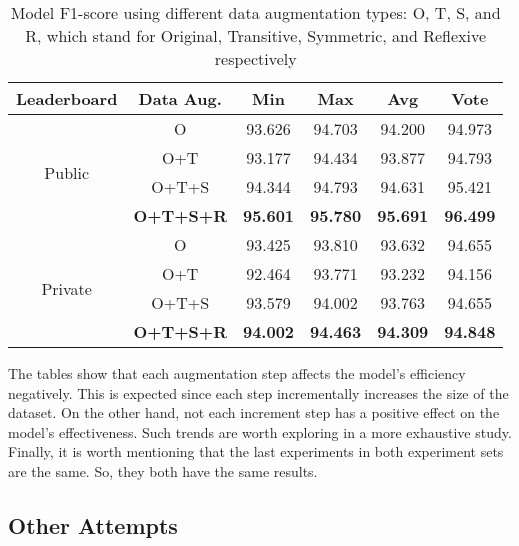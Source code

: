\documentclass[11pt,a4paper]{article}
\begin{document}
\begin{table*}
\centering
\caption{Model F1-score using different data augmentation types: O, T, S, and R, which stand for Original, Transitive, Symmetric, and Reflexive respectively}
\label{tab:p2_2}
\begin{tabular}{|c|c|c|c|c|c|}
\hline
Leaderboard              & Data Aug. & Min             & Max             & Avg             & Vote            \\ \hline
\multirow{4}{*}{Public}  & O                 & 93.626          & 94.703          & 94.200          & 94.973          \\ \cline{2-6} 
                         & O+T               & 93.177          & 94.434          & 93.877          & 94.793          \\ \cline{2-6} 
                         & O+T+S             & 94.344          & 94.793          & 94.631          & 95.421          \\ \cline{2-6} 
                         & \textbf{O+T+S+R}  & \textbf{95.601} & \textbf{95.780} & \textbf{95.691} & \textbf{96.499} \\ \hline
\multirow{4}{*}{Private} & O                 & 93.425          & 93.810          & 93.632          & 94.655          \\ \cline{2-6} 
                         & O+T               & 92.464          & 93.771          & 93.232          & 94.156          \\ \cline{2-6} 
                         & O+T+S             & 93.579          & 94.002          & 93.763          & 94.655          \\ \cline{2-6} 
                         & \textbf{O+T+S+R}  & \textbf{94.002} & \textbf{94.463} & \textbf{94.309} & \textbf{94.848} \\ \hline
\end{tabular}
\end{table*}

The tables show that each augmentation step affects the model's efficiency negatively. This is expected since each step incrementally increases the size of the dataset. On the other hand, not each increment step has a positive effect on the model's effectiveness. Such trends are worth exploring in a more exhaustive study. Finally, it is worth mentioning that the last experiments in both experiment sets are the same. So, they both have the same results.

\subsection{Other Attempts}
\end{document}
